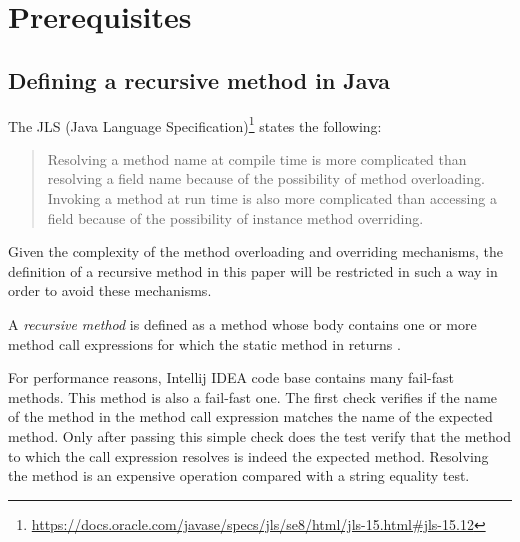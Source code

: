 \chapter{Prerequisites}

\section{Defining a recursive method in Java}

The JLS (Java Language Specification)\nocite{jls}\footnote{\url{https://docs.oracle.com/javase/specs/jls/se8/html/jls-15.html#jls-15.12}}
states the following:
\begin{quote}
    Resolving a method name at compile time is more complicated than resolving a field name because of the possibility
    of method overloading. Invoking a method at run time is also more complicated than accessing a field because of the
    possibility of instance method overriding.
\end{quote}
Given the complexity of the method overloading and overriding mechanisms, the definition of a recursive method in this
paper will be restricted in such a way in order to avoid these mechanisms.

A \textit{recursive method} is defined as a method whose body contains one or more method call expressions for which the
static method in  returns .


For performance reasons, Intellij IDEA code base contains many fail-fast methods. This method is also a fail-fast one.
The first check verifies if the name of the method in the method call expression matches the name of the expected
method. Only after passing this simple check does the test verify that the method to which the call expression resolves
is indeed the expected method. Resolving the method is an expensive operation compared with a string equality test.


